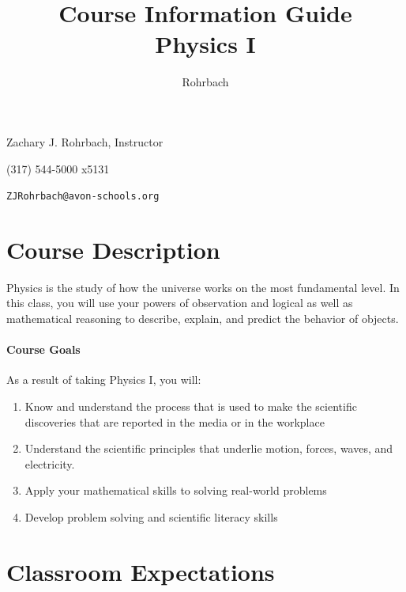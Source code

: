 \documentclass[9pt]{exam}
\title{Course Information Guide \\ Physics I}
\author{Rohrbach}
\begin{document}
\maketitle

\noindent Zachary J. Rohrbach, Instructor

\noindent (317) 544-5000 x5131

\noindent \texttt{ZJRohrbach@avon-schools.org}

\section*{Course Description}

Physics is the study of how the universe works on the most fundamental level.  In this 
class, you will use your powers of observation and logical as well as mathematical 
reasoning to describe, explain, and predict the behavior of objects.

\paragraph{Course Goals} 
As a result of taking Physics I, you will:

\begin{enumerate}
	\item Know and understand the process that is used to make the scientific discoveries that 
				are reported in the media or in the workplace
	\item Understand the scientific principles that underlie motion, forces, waves, and electricity.
	\item Apply your mathematical skills to solving real-world problems
	\item Develop problem solving and scientific literacy skills
\end{enumerate}


\section*{Classroom Expectations}
\end{document}
